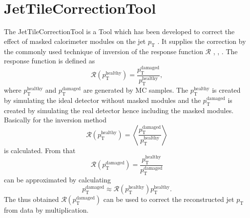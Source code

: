 \section{JetTileCorrectionTool}
The JetTileCorrectionTool is a Tool which has been developed to correct the effect of masked calorimeter modules on the jet $p_{\text{T}}$ \cite{RodriguezPerez:2126928}.
It supplies the correction by the commonly used technique of inversion of the response function $\mathcal{R}$ \cite{Aad:2014bia}, \cite{LopezMateos:1201006}, \cite{Marshall:1111434}.
The response function is defined as
\begin{equation}
	\mathcal{R}(p_{\text{T}}^{\text{healthy}}) = \frac{p_{\text{T}}^{\text{damaged}}}{p_{\text{T}}^{\text{healthy}}},
\end{equation}
where $p_{\text{T}}^{\text{healthy}}$ and $p_{\text{T}}^{\text{damaged}}$ are generated by MC samples.
The $p_{\text{T}}^{\text{healthy}}$ is created by simulating the ideal detector without masked modules and the $p_{\text{T}}^{\text{damaged}}$ is created by simulating the real detector hence including the masked modules.
Basically for the inversion method
\begin{equation}
\mathcal{R}(p_{\text{T}}^{\text{healthy}}) = \left< \frac{p_{\text{T}}^{\text{damaged}}}{p_{\text{T}}^{\text{healthy}}}\right>
\end{equation}
is calculated.
From that
\begin{equation}
	\mathcal{R}(p_{\text{T}}^{\text{damaged}}) = \frac{p_{\text{T}}^{\text{healthy}}}{p_{\text{T}}^{\text{damaged}}}	
\end{equation}
can be approximated by calculating
\begin{equation}
	p_{\text{T}}^{\text{damaged}} \approx \mathcal{R}(p_{\text{T}}^{\text{healthy}}) p_{\text{T}}^{\text{healthy}}.
\end{equation}
The thus obtained $\mathcal{R}(p_{\text{T}}^{\text{damaged}})$ can be used to correct the reconstructed jet $p_{\text{T}}$ from data by multiplication.


